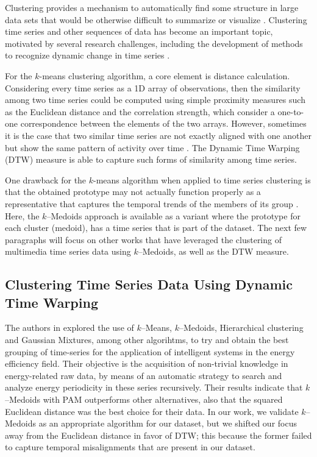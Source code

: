 Clustering provides a mechanism to automatically find some structure in large data sets that would be otherwise difficult to summarize or visualize \cite{Aggarwal2013}. Clustering time series and other sequences of data has become an important topic, motivated by several research challenges, including the development of methods to recognize dynamic change in time series \cite{Wang2004}. 

For the $k$-means clustering algorithm, a core element is distance calculation. Considering every time series as a 1D array of observations, then the similarity among two time series could be computed using simple proximity measures such as the Euclidean distance and the correlation strength, which consider a one-to-one correspondence between the elements of the two arrays. However, sometimes it is the case that two similar time series are not exactly aligned with one another but show the same pattern of activity over time \cite{Fu2011}. The Dynamic Time Warping (DTW) \cite{Sakoe1978} measure is able to capture such forms of similarity among time series. 

One drawback for the $k$-means algorithm when applied to time series clustering is that the obtained prototype may not actually function properly as a representative that captures the temporal trends of the members of its group \cite{Aghabozorgi2015}. Here, the $k$--Medoids approach is available as a variant where the prototype for each cluster (medoid), has a time series that is part of the dataset. %
The next few paragraphs will focus on other works that have leveraged the clustering of multimedia time series data using $k$--Medoids, as well as the DTW measure.

\subsection{Clustering Time Series Data Using Dynamic Time Warping}

The authors in \cite{Ruiz2020} explored the use of $k$--Means, $k$--Medoids, Hierarchical clustering and Gaussian Mixtures, among other algorihtms, to try and obtain the best grouping of time-series for the application of intelligent systems in the energy efficiency field. Their objective is the acquisition of non-trivial knowledge in energy-related raw data, by means of an automatic strategy to search and analyze energy periodicity in these series recursively. Their results indicate that $k$--Medoids with PAM outperforms other alternatives, also that the squared Euclidean distance was the best choice for their data. In our work, we validate $k$--Medoids as an appropriate algorithm for our dataset, but we shifted our focus away from the Euclidean distance in favor of DTW; this because the former failed to capture temporal misalignments that are present in our dataset.

